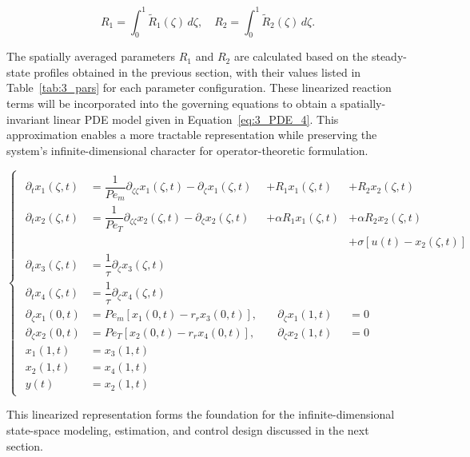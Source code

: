\begin{equation}
    R_1 = \int_0^1 \tilde{R}_1(\zeta) \, d\zeta, \quad
    R_2 = \int_0^1 \tilde{R}_2(\zeta) \, d\zeta.
\end{equation}

The spatially averaged parameters $R_1$ and $R_2$ are calculated based on the steady-state profiles obtained in the previous section, with their values listed in Table~\ref{tab:3_pars} for each parameter configuration. These linearized reaction terms will be incorporated into the governing equations to obtain a spatially-invariant linear PDE model given in Equation~\eqref{eq:3_PDE_4}. This approximation enables a more tractable representation while preserving the system's infinite-dimensional character for operator-theoretic formulation.

\begin{equation} \label{eq:3_PDE_4}
\begin{cases}
\begin{alignedat}{3}
    \partial_{t} x_1(\zeta, t) &= \dfrac{1}{Pe_m} \partial_{\zeta\zeta} x_1(\zeta, t) 
    - \partial_{\zeta} x_1(\zeta, t) 
    &+ R_1 x_1(\zeta, t) &+ R_2 x_2(\zeta, t) \\[2.0ex]

    \partial_{t} x_2(\zeta, t) &= \dfrac{1}{Pe_T} \partial_{\zeta\zeta} x_2(\zeta, t) 
    - \partial_{\zeta} x_2(\zeta, t)
    &+ \alpha R_1 x_1(\zeta, t)  &+ \alpha R_2 x_2(\zeta, t) \\
    &&&+ \sigma \left[ u(t) - x_2(\zeta, t) \right] \\[2.0ex]

    \partial_{t} x_3(\zeta, t) &= \dfrac{1}{\tau} \partial_{\zeta} x_3(\zeta, t) 
    &\quad & \\[2.0ex]

    \partial_{t} x_4(\zeta, t) &= \dfrac{1}{\tau} \partial_{\zeta} x_4(\zeta, t) 
    &\quad & \\[3.0ex]

    \partial_\zeta x_1(0, t) &= Pe_m \left[ x_1(0, t) - r_r x_3(0, t) \right], 
    &\quad \partial_{\zeta} x_1(1, t) &= 0 \\[1.5ex]

    \partial_\zeta x_2(0, t) &= Pe_T \left[ x_2(0, t) - r_r x_4(0, t) \right], 
    &\quad \partial_{\zeta} x_2(1, t) &= 0 \\[1.5ex]

    x_1(1, t) &= x_3(1, t) \\[1.5ex]
    x_2(1, t) &= x_4(1, t) \\[1.5ex]
    y(t) &= x_2(1, t)
\end{alignedat}
\end{cases}
\end{equation}

This linearized representation forms the foundation for the infinite-dimensional state-space modeling, estimation, and control design discussed in the next section.
